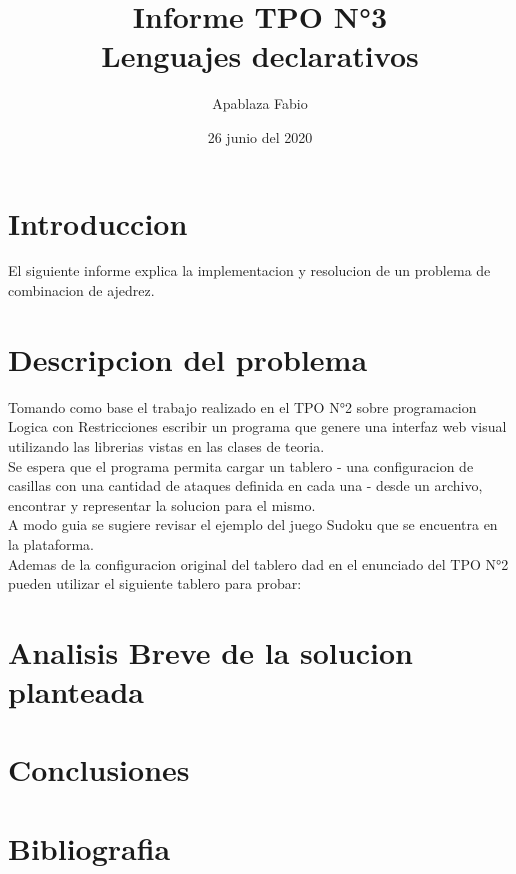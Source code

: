 \documentclass{article}
\title{\Huge\textbf{Informe TPO N°3}\\ Lenguajes declarativos}
\author{Apablaza Fabio}
\date{26 junio del 2020}
\begin{document}
\maketitle
\newpage


\section{Introduccion}
El siguiente informe explica la implementacion y resolucion de un problema de combinacion de ajedrez.

\newpage

\section{Descripcion del problema}
\begin{Center}
Tomando como base el trabajo realizado en el TPO N°2 sobre programacion Logica con Restricciones escribir un programa que genere una interfaz web visual utilizando las librerias vistas en las clases de teoria.\\
Se espera que el programa permita cargar un tablero - una configuracion de casillas con una cantidad de ataques definida en cada una - desde un archivo, encontrar y representar la solucion para el mismo.\\
A modo guia se sugiere revisar el ejemplo del juego Sudoku que se encuentra en la plataforma.\\
Ademas de la configuracion original del tablero dad en el enunciado del TPO N°2 pueden utilizar el siguiente tablero para probar:\\

\end{Center}

\newpage
\section{Analisis Breve de la solucion planteada}

\newpage
\section{Conclusiones}

\newpage
\section{Bibliografia}
\end{document}
